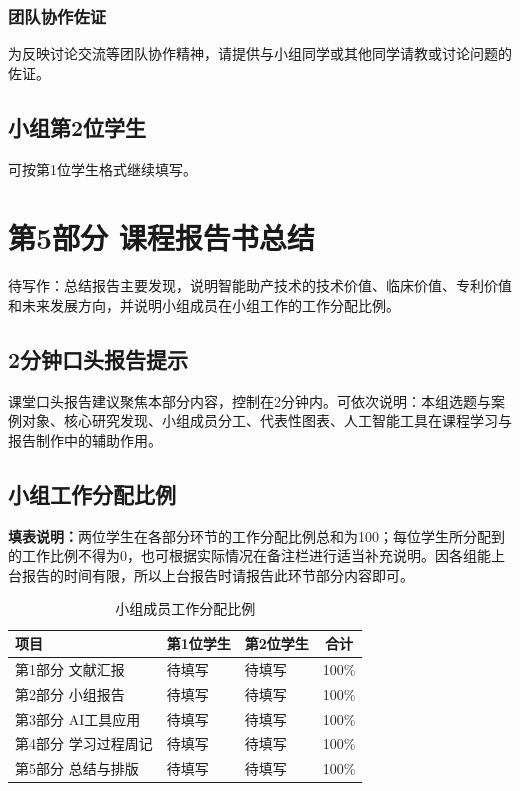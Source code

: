 \documentclass[UTF8,zihao=-4]{ctexart}
\begin{document}
\subsubsection*{团队协作佐证}
为反映讨论交流等团队协作精神，请提供与小组同学或其他同学请教或讨论问题的佐证。

\subsection*{小组第2位学生}

可按第1位学生格式继续填写。

\newpage

\section*{第5部分 课程报告书总结}

待写作：总结报告主要发现，说明智能助产技术的技术价值、临床价值、专利价值和未来发展方向，并说明小组成员在小组工作的工作分配比例。

\subsection*{2分钟口头报告提示}

课堂口头报告建议聚焦本部分内容，控制在2分钟内。可依次说明：本组选题与案例对象、核心研究发现、小组成员分工、代表性图表、人工智能工具在课程学习与报告制作中的辅助作用。

\subsection*{小组工作分配比例}

\noindent\textbf{填表说明：}两位学生在各部分环节的工作分配比例总和为100；每位学生所分配到的工作比例不得为0，也可根据实际情况在备注栏进行适当补充说明。因各组能上台报告的时间有限，所以上台报告时请报告此环节部分内容即可。

\begin{table}[H]
    \centering
    \caption{小组成员工作分配比例}
    \begin{tabularx}{\textwidth}{lXXc}
        \toprule
        项目 & 第1位学生 & 第2位学生 & 合计 \\
        \midrule
        第1部分 文献汇报 & 待填写 & 待填写 & 100\% \\
        第2部分 小组报告 & 待填写 & 待填写 & 100\% \\
        第3部分 AI工具应用 & 待填写 & 待填写 & 100\% \\
        第4部分 学习过程周记 & 待填写 & 待填写 & 100\% \\
        第5部分 总结与排版 & 待填写 & 待填写 & 100\% \\
        \bottomrule
    \end{tabularx}
\end{table}
\end{document}
